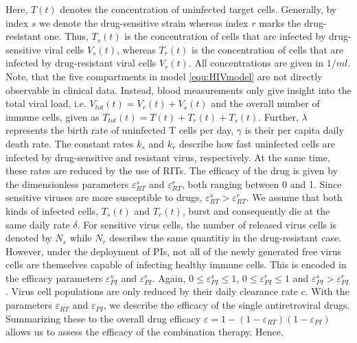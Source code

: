 Here, $T(t)$ denotes the concentration of uninfected target cells.
Generally, by index $s$ we denote the drug-sensitive strain whereas index $r$ marks the drug-resistant one.
Thus, $T_s(t)$ is the concentration of cells that are infected by drug-sensitive viral cells $V_s(t)$, whereas $T_r(t)$ is the concentration of cells that are infected by drug-resistant viral cells $V_r(t)$.
All concentrations are given in $1/ml$.
Note, that the five compartments in model \ref{equ:HIVmodel} are not directly observable in clinical data.
Instead, blood measurements only give insight into the total viral load, i.e. $V_{tot}(t) = V_r(t) + V_s(t)$ and the overall number of 
immune cells, given as $T_{tot}(t) = T(t) + T_r(t) + T_s(t)$.\newline
Further, $\lambda$ represents the birth rate of uninfected T cells per day, $\gamma$ is their per capita daily death rate.
The constant rates $k_s$ and $k_r$ describe how fast uninfected cells are infected by drug-sensitive and resistant virus, respectively.
At the same time, these rates are reduced by the use of RITs. The efficacy of the drug is given by the dimensionless 
parameters $\varepsilon_{RT}^{s}$ and $\varepsilon_{RT}^{r}$, both ranging between 0 and 1.
Since sensitive viruses are more susceptible to drugs, $\varepsilon_{RT}^{s} > \varepsilon_{RT}^{r}$.
We assume that both kinds of infected cells, $T_s(t)$ and $T_r(t)$, burst and consequently die at the same daily rate $\delta$.
For sensitive virus cells, the number of released virus cells is denoted by $N_s$ 
while $N_r$ describes the same quantitiy in the drug-resistant case.
However, under the deployment of PIs, not all of the newly generated free virus cells are themselves capable of infecting healthy immune 
cells. This is encoded in the efficacy parameters $\varepsilon_{PI}^s$ and $\varepsilon_{PI}^r$. Again, $0 \leq \varepsilon_{PI}^s \leq 1$, 
$0 \leq \varepsilon_{PI}^r \leq 1$ and $\varepsilon_{PI}^s > \varepsilon_{PI}^r$.
Virus cell populations are only reduced by their daily clearance rate $c$.\newline
With the parameters $\varepsilon_{RT}$ and $\varepsilon_{PI}$, we describe the efficacy of the single antiretroviral drugs.
Summarizing these to the overall drug efficacy $\varepsilon = 1 - (1-\varepsilon_{RT})(1-\varepsilon_{PI})$ allows us to assess the efficacy of 
the combination therapy.
Hence,

